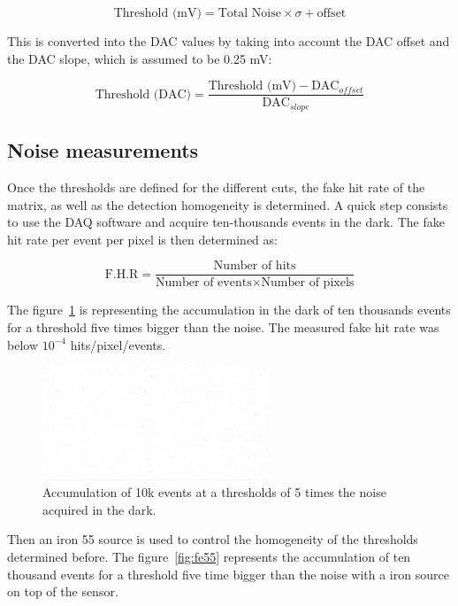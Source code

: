   \begin{equation}
    \text{Threshold (mV)} = \text{Total Noise} \times \sigma + \text{offset}
  \end{equation}

  This is converted into the DAC values by taking into account the DAC offset and the DAC slope, which is assumed to be 0.25 mV:
  
  \begin{equation}
    \text{Threshold (DAC)} = \frac{\text{Threshold (mV)} - \text{DAC}_{offset}}{\text{DAC}_{slope}}
  \end{equation}

  \subsection{Noise measurements}

  Once the thresholds are defined for the different cuts, the fake hit rate of the matrix, as well as the detection homogeneity is determined.
  A quick step consists to use the DAQ software and acquire ten-thousands events in the dark. 
  The fake hit rate per event per pixel is then determined as:

  \begin{equation}
    \text{F.H.R} = \frac{\text{Number of hits}}{\text{Number of events} \times \text{Number of pixels}} 
  \end{equation}
  
  The figure~\ref{fig:darkEvents} is representing the accumulation in the dark of ten thousands events for a threshold five times bigger than the noise.
  The measured fake hit rate was below $10^{-4}$ hits/pixel/events.

   \begin{figure}[!h]
    \centering
    \includegraphics[width=0.6\textwidth]{Pictures/labTests/8sigma_10kEvents_noSource}
    \caption{Accumulation of 10k events at a thresholds of 5 times the noise acquired in the dark.}
    \label{fig:darkEvents}
  \end{figure}

  Then an iron 55 source is used to control the homogeneity of the thresholds determined before.
  The figure~\ref{fig:fe55} represents the accumulation of ten thousand events for a threshold five time bigger than the noise with a iron source on top of the sensor.
  
